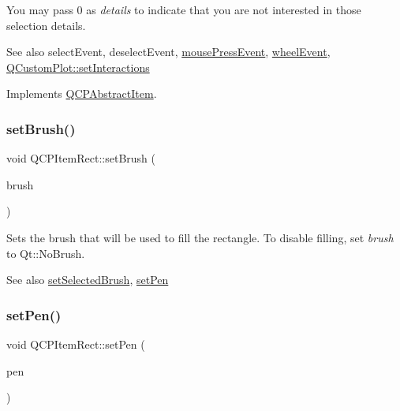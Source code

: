 You may pass 0 as {\itshape details} to indicate that you are not interested in those selection details.

\begin{DoxySeeAlso}{See also}
select\+Event, deselect\+Event, \hyperlink{class_q_c_p_layerable_af6567604818db90f4fd52822f8bc8376}{mouse\+Press\+Event}, \hyperlink{class_q_c_p_layerable_a47dfd7b8fd99c08ca54e09c362b6f022}{wheel\+Event}, \hyperlink{class_q_custom_plot_a5ee1e2f6ae27419deca53e75907c27e5}{Q\+Custom\+Plot\+::set\+Interactions} 
\end{DoxySeeAlso}


Implements \hyperlink{class_q_c_p_abstract_item_ae41d0349d68bb802c49104afd100ba2a}{Q\+C\+P\+Abstract\+Item}.

\mbox{\label{class_q_c_p_item_rect_abbd4e346a03513ee466afc25d9c75446}} 
\subsubsection{\texorpdfstring{set\+Brush()}{setBrush()}}
{\footnotesize\ttfamily void Q\+C\+P\+Item\+Rect\+::set\+Brush (\begin{DoxyParamCaption}\item[{const Q\+Brush \&}]{brush }\end{DoxyParamCaption})}

Sets the brush that will be used to fill the rectangle. To disable filling, set {\itshape brush} to Qt\+::\+No\+Brush.

\begin{DoxySeeAlso}{See also}
\hyperlink{class_q_c_p_item_rect_abd1792859844118dedee86223cede7af}{set\+Selected\+Brush}, \hyperlink{class_q_c_p_item_rect_a483c0da5a17e1646cd17ddea2c124e7d}{set\+Pen} 
\end{DoxySeeAlso}
\mbox{\label{class_q_c_p_item_rect_a483c0da5a17e1646cd17ddea2c124e7d}} 
\subsubsection{\texorpdfstring{set\+Pen()}{setPen()}}
{\footnotesize\ttfamily void Q\+C\+P\+Item\+Rect\+::set\+Pen (\begin{DoxyParamCaption}\item[{const Q\+Pen \&}]{pen }\end{DoxyParamCaption})}

